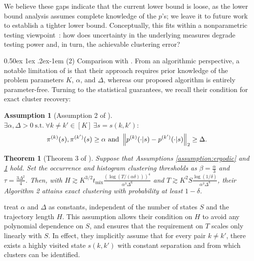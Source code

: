 \documentclass[twoside]{article}
\makeatletter
\renewcommand{\paragraph}{%
  \@startsection{paragraph}{4}%
  {\z@}{0.50ex \@plus 1ex \@minus .2ex}{-1em}%
  {\normalfont\normalsize\bfseries}%
}
\theoremstyle{plain}
\newtheorem{assumption}{Assumption}
\newtheorem{theoremplain}{Theorem}[section]
\def\bignorm#1{\left\lVert #1 \right\rVert}
\newcommand{\mix}{\mathrm{mix}}
\makeatother
\begin{document}
We believe these gaps indicate that the current lower bound is loose, as the lower bound analysis assumes complete knowledge of the $p$'s; we leave it to future work to establish a tighter lower bound.
Conceptually, this fits within a nonparametric testing viewpoint~\citep{tsybakov09}: how does uncertainty in the underlying measures degrade testing power and, in turn, the achievable clustering error?



\paragraph{\texorpdfstring{(2) Comparison with \citet{kausik2023mixture}.}{(2) Comparison with Kausik et al. (2023)}}
\label{sec:compare-kausik}
From an algorithmic perspective, a notable limitation of \citet{kausik2023mixture} is that their approach requires prior knowledge of the problem parameters $K$, $\alpha$, and $\Delta$, whereas our proposed algorithm is entirely parameter-free. 
Turning to the statistical guarantees, we recall their condition for exact cluster recovery:
\begin{assumption}[Assumption 2 of \citealt{kausik2023mixture}]
\label{assumption:kausik}
    $\exists \alpha, \Delta > 0 \ \text{s.t.} \ \forall k \neq k' \in [K] \ \exists s = s(k, k'):$
    \begin{equation*}
         \pi^{(k)}(s), \pi^{(k')}(s) \geq \alpha \ \hbox{and} \ \bignorm{p^{(k)}(\cdot | s) - p^{(k')}(\cdot | s)}_2 \geq \Delta.
    \end{equation*}
\end{assumption}
\begin{theoremplain}[Theorem 3 of \citealt{kausik2023mixture}]
\label{thm:kausik}
    Suppose that Assumptions \ref{assumption:ergodic} and \ref{assumption:kausik} hold.
    Set the occurrence and histogram clustering thresholds as $\beta = \frac{\alpha}{3}$ and $\tau = \frac{3\Delta^2}{4}$.
    Then, with $H \gtrsim K^{3/2} t_\mix \frac{\left( \log (T / (\alpha \delta)) \right)^4}{\alpha^3 \Delta^6}$ and $T \gtrsim K^2 S \frac{\log(1/\delta)}{\alpha^3 \Delta^8}$, their Algorithm 2 attains exact clustering with probability at least $1 - \delta$.
\end{theoremplain}
\citet{kausik2023mixture} treat $\alpha$ and $\Delta$ as constants, independent of the number of states $S$ and the trajectory length $H$. This assumption allows their condition on $H$ to avoid any polynomial dependence on $S$, and ensures that the requirement on $T$ scales only linearly with $S$. In effect, they implicitly assume that for every pair $k \neq k'$, there exists a highly visited state $s(k, k')$ with constant separation and from which clusters can be identified.
\end{document}
